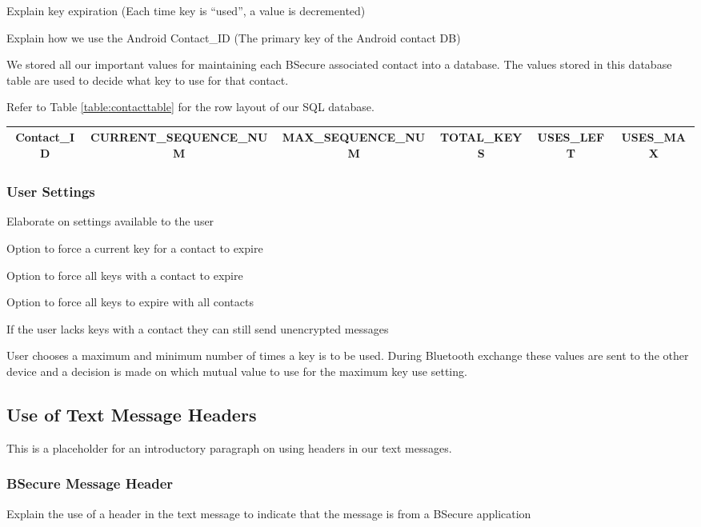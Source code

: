 Explain key expiration (Each time key is ``used'', a value is decremented)

Explain how we use the Android Contact\_ID (The primary key of the Android contact DB)

We stored all our important values for maintaining each BSecure associated contact
into a database. The values stored in this database table are used to decide what key to use for that
contact.

Refer to Table \ref{table:contacttable} for the row layout of our SQL database.

\begin{table*}
\centering
\caption{Contact Table Design}
\label{table:contacttable}
\begin{tabular}{|c|c|c|c|c|c|} \hline
Contact\_ID&CURRENT\_SEQUENCE\_NUM&MAX\_SEQUENCE\_NUM&TOTAL\_KEYS&USES\_LEFT&USES\_MAX\\ \hline\end{tabular}
\end{table*}

\subsubsection{User Settings}
Elaborate on settings available to the user

Option to force a current key for a contact to expire

Option to force all keys with a contact to expire

Option to force all keys to expire with all contacts

If the user lacks keys with a contact they can still send unencrypted messages

User chooses a maximum and minimum number of times a key is to be used. During Bluetooth exchange
these values are sent to the other device and a decision is made on which mutual value to use for the maximum key use setting.

\subsection{Use of Text Message Headers}
This is a placeholder for an introductory paragraph on using headers in our text messages.

\subsubsection{BSecure Message Header}
Explain the use of a header in the text message to indicate that the message is from a BSecure application

